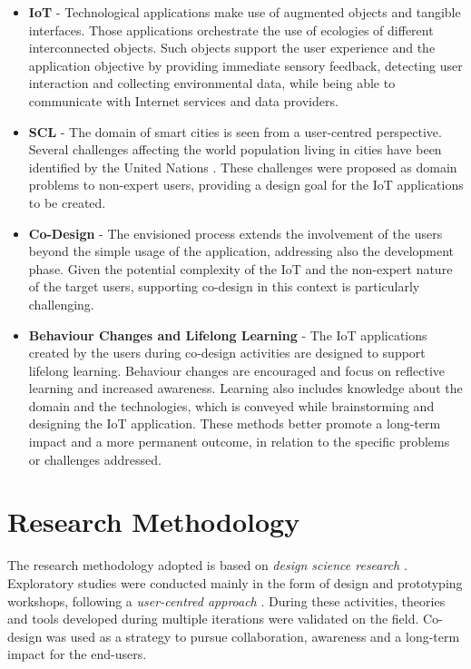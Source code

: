 \begin{itemize}
\item \textbf{IoT} - Technological applications make use of augmented objects and tangible interfaces. Those applications orchestrate the use of ecologies of different interconnected objects. Such objects support the user experience and the application objective by providing immediate sensory feedback, detecting user interaction and collecting environmental data, while being able to communicate with Internet services and data providers.

\item \textbf{SCL} - The domain of smart cities is seen from a user-centred perspective. Several challenges affecting the world population living in cities have been identified by the United Nations \autocite{un_smart_2015}. These challenges were proposed as domain problems to non-expert users, providing a design goal for the IoT applications to be created.

\item \textbf{Co-Design} - The envisioned process extends the involvement of the users beyond the simple usage of the application, addressing also the development phase. Given the potential complexity of the IoT and the non-expert nature of the target users, supporting co-design in this context is particularly challenging.

\item \textbf{Behaviour Changes and Lifelong Learning} -  The IoT applications created by the users during co-design activities are designed to support lifelong learning. Behaviour changes are encouraged and focus on reflective learning and increased awareness. Learning also includes knowledge about the domain and the technologies, which is conveyed while brainstorming and designing the IoT application. These methods better promote a long-term impact and a more permanent outcome, in relation to the specific problems or challenges addressed.
\end{itemize}

\pagebreak

\section{Research Methodology}
\label{sec:research-methodology}

The research methodology adopted is based on \emph{design science research} \autocites{hevner_design_2010}{march_design_1995}. Exploratory studies were conducted mainly in the form of design and prototyping workshops, following a \emph{user-centred approach} \autocites{maguire_methods_2001}{gulliksen_key_2003}. During these activities, theories and tools developed during multiple iterations were validated on the field. Co-design was used as a strategy to pursue collaboration, awareness and a long-term impact for the end-users.

